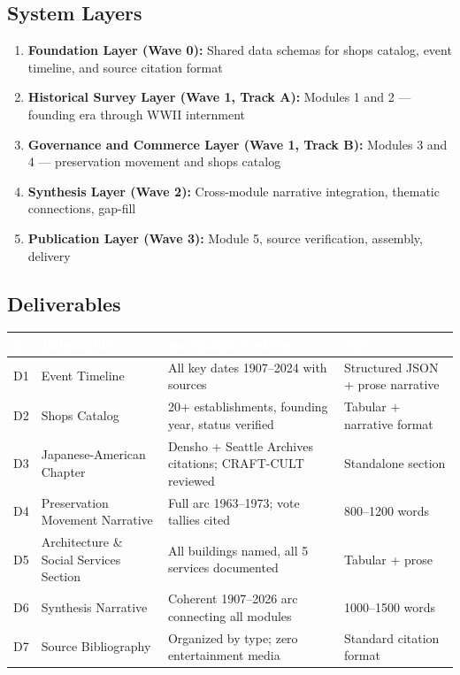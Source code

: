 \documentclass[11pt,letterpaper]{article}
\newcommand{\tableheader}[1]{\textbf{\sffamily\textcolor{white}{#1}}}
\begin{document}
\subsection{System Layers}

\begin{enumerate}[noitemsep]
  \item \textbf{Foundation Layer (Wave 0):} Shared data schemas for shops catalog, event timeline, and source citation format
  \item \textbf{Historical Survey Layer (Wave 1, Track A):} Modules 1 and 2 --- founding era through WWII internment
  \item \textbf{Governance and Commerce Layer (Wave 1, Track B):} Modules 3 and 4 --- preservation movement and shops catalog
  \item \textbf{Synthesis Layer (Wave 2):} Cross-module narrative integration, thematic connections, gap-fill
  \item \textbf{Publication Layer (Wave 3):} Module 5, source verification, assembly, delivery
\end{enumerate}

\subsection{Deliverables}

\begin{center}
\begin{tabularx}{\textwidth}{C{0.8cm}L{4cm}L{4cm}X}
\toprule
{}
\tableheader{\#} & \tableheader{Deliverable} & \tableheader{Acceptance Criteria} & \tableheader{Spec} \\
\midrule
D1 & Event Timeline & All key dates 1907--2024 with sources & Structured JSON + prose narrative \\
D2 & Shops Catalog & 20+ establishments, founding year, status verified & Tabular + narrative format \\
D3 & Japanese-American Chapter & Densho + Seattle Archives citations; CRAFT-CULT reviewed & Standalone section \\
D4 & Preservation Movement Narrative & Full arc 1963--1973; vote tallies cited & 800--1200 words \\
D5 & Architecture \& Social Services Section & All buildings named, all 5 services documented & Tabular + prose \\
D6 & Synthesis Narrative & Coherent 1907--2026 arc connecting all modules & 1000--1500 words \\
D7 & Source Bibliography & Organized by type; zero entertainment media & Standard citation format \\
\bottomrule
\end{tabularx}
\end{center}
\end{document}
